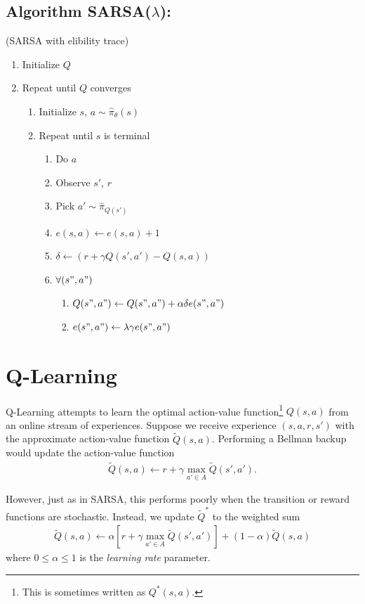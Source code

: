 \documentclass[11pt]{article}
\numberwithin{equation}{section}
\numberwithin{figure}{section}
\begin{document}
\subsection*{Algorithm SARSA($\lambda$):}
(SARSA with elibility trace)
\begin{enumerate}
	\item Initialize $Q$
	\item Repeat until $Q$ converges
	\begin{enumerate}
		\item Initialize $s$, $a \sim \hat{\pi}_\theta(s)$
		\item Repeat until $s$ is terminal
		\begin{enumerate}
			\item Do $a$
			\item Observe $s'$, $r$
			\item Pick $a' \sim \hat{\pi}_{Q(s')}$
			\item $e(s,a) \leftarrow e(s,a) + 1$
			\item $\delta \leftarrow (r + \gamma Q(s',a') - Q(s,a))$
			\item $\forall (s",a")$
			\begin{enumerate}
				\item $Q(s",a") \leftarrow Q(s",a") + \alpha \delta e(s",a")$
				\item $e(s",a") \leftarrow \lambda \gamma e(s",a")$	
			\end{enumerate}
		\end{enumerate}
	\end{enumerate}
\end{enumerate}

\section{Q-Learning}
Q-Learning attempts to learn the optimal action-value function\footnote{This is
sometimes written as $Q^*(s, a)$.} $Q(s, a)$ from an online stream of
experiences. Suppose we receive experience $(s, a, r, s')$ with the approximate
action-value function $\tilde{Q}(s, a)$. Performing a Bellman backup would
update the action-value function
\begin{align*}
    \tilde{Q}(s, a) \gets r + \gamma \max_{a' \in A} \tilde{Q}(s', a').
\end{align*}

However, just as in SARSA, this performs poorly when the transition or reward
functions are stochastic. Instead, we update $\tilde{Q}^*$ to the weighted sum
\begin{align*}
    \tilde{Q}(s, a) \gets \alpha \left[r + \gamma \max_{a' \in A} \tilde{Q}(s', a')\right]
                          + (1 - \alpha) \tilde{Q}(s, a)
\end{align*}
where $0 \le \alpha \le 1$ is the \emph{learning rate} parameter.
\end{document}
